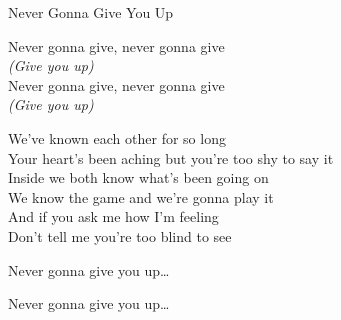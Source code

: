 \begin{song}{Never Gonna Give You Up}
  \begin{SBSection*}
    Never gonna give, never gonna give\\
    \emph{(Give you up)}\\
    Never gonna give, never gonna give\\
    \emph{(Give you up)}
  \end{SBSection*}

  \begin{SBVerse}
    We've known each other for so long\\
    Your heart's been aching but you're too shy to say it\\
    Inside we both know what's been going on\\
    We know the game and we're gonna play it\\\medskip
    And if you ask me how I'm feeling\\
    Don't tell me you're too blind to see
  \end{SBVerse}

  \begin{SBChorus}
    Never gonna give you up\ldots
  \end{SBChorus}

  \begin{SBChorus}
    Never gonna give you up\ldots
  \end{SBChorus}
\end{song}